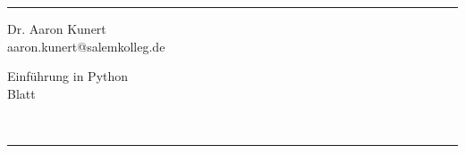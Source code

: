 \fancyhead[C]{}
\hrule \medskip %
\begin{minipage}[t]{0.295\textwidth}
\raggedright
\footnotesize
Dr. Aaron Kunert \hfill\\   
aaron.kunert@salemkolleg.de \hfill \\
\end{minipage}
\begin{minipage}[t]{0.4\textwidth} 
\centering 
\large 
Einführung in Python\\ 
\normalsize 
Blatt \thesheetnumber{}\\ 
\end{minipage}
\begin{minipage}[t]{0.295\textwidth} 
\raggedleft
\footnotesize
\thesheetdate{}
\hfill\\
\end{minipage}
\medskip\hrule 
\bigskip